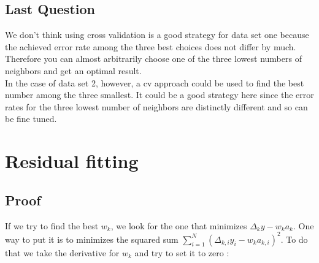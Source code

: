 \documentclass{article}
\begin{document}
\subsection{Last Question}
We don't think using cross validation is a good strategy for data set one because the achieved error rate among the three best choices does not differ by much. Therefore you can almost arbitrarily choose one of the three lowest numbers of neighbors and get an optimal result. \\
In the case of data set 2, however, a cv approach could be used to find the best number among the three smallest. It could be a good strategy here since the error rates for the three lowest number of neighbors are distinctly different and so can be fine tuned.

\section{Residual fitting}
\subsection{Proof}


If we try to find the best $w_k$, we look for the one that minimizes $\Delta_ky - w_k a_k$.
One way to put it is to minimizes the squared sum $\sum\limits_{i=1}^N ( \Delta_{k,i}y_i - w_k a_{k,i})^2$.
To do that we take the derivative for $w_k$ and try to set it to zero :
\end{document}
